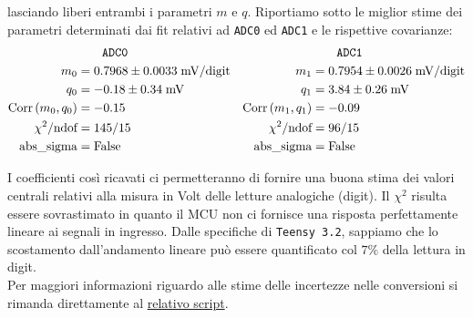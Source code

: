 \documentclass{article}[a4paper, oneside, 11pt]
\begin{document}
lasciando liberi entrambi i parametri $m$ e $q$. Riportiamo sotto le miglior
stime dei parametri determinati dai fit relativi ad \verb+ADC0+ ed \verb+ADC1+ 
e le rispettive covarianze:
\begin{align*}
	&\qquad \texttt{ADC0}	&&\qquad  \texttt{ADC1} \\
	m_0 &= 0.7968 \pm  0.0033  \; \mathrm{mV/digit} 
	& m_1  &= 0.7954 \pm 0.0026  \; \mathrm{mV/digit} \\
	q_0 &= - 0.18 \pm 0.34  \; \si{\mV} 	
	&q_1 &= 3.84  \pm 0.26  \; \si{\mV} \\
	\corr{m_0} {q_0} &= - 0.15      &\corr{m_1}{q_1} &= - 0.09 \\
	\chi^2/\text{ndof} &= 145/15	&\chi^2/\text{ndof} &= 96/15 \\ 
	\text{abs\_sigma} &= \rm False	&\text{abs\_sigma} &= \rm False
\end{align*}

\begin{figure}[H]%
\centering
\begin{subfigure}{.5\textwidth}
	\centering 
	\def\svgwidth{\columnwidth}
		
	\label{fig: cal0}
\end{subfigure}%
\begin{subfigure} {.5\textwidth}
	\centering 
	\def\svgwidth{\columnwidth}
		
	\label{fig: cal1}
\end{subfigure}
\end{figure}

I coefficienti così ricavati ci permetteranno di fornire una buona stima 
dei valori centrali relativi alla misura in Volt delle letture analogiche 
(digit). Il $\chi^2$ risulta essere sovrastimato in quanto il MCU non ci 
fornisce una risposta perfettamente lineare ai segnali in ingresso. Dalle 
specifiche di \verb+Teensy 3.2+, sappiamo che lo scostamento dall'andamento
lineare può essere quantificato col $7 \%$ della lettura in digit.\\
Per maggiori informazioni riguardo alle stime delle incertezze nelle 
conversioni si rimanda direttamente al 
\href{https://github.com/LucaCiucci/relaz_seme/blob/master/Cartella_fit/funzioni.py}
{relativo script}.
\end{document}
